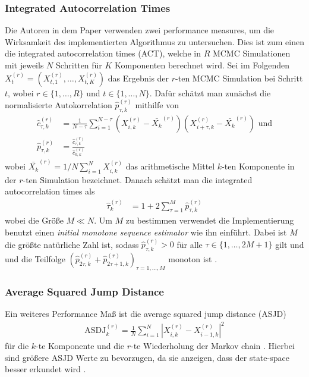 \documentclass{scrartcl}
\begin{document}
    \subsubsection{Integrated Autocorrelation Times}
    Die Autoren in dem Paper \cite{lau2019} verwenden zwei performance measures, um die Wirksamkeit des implementierten
    Algorithmus zu untersuchen. Dies ist zum einen die integrated autocorrelation times (ACT), welche in $R$ MCMC
    Simulationen mit jeweils $N$ Schritten für $K$ Komponenten berechnet wird. Sei im Folgenden
    $X_t^{(r)}=(X_{t,1}^{(r)},\dots,X_{t,K}^{(r)})$ das Ergebnis der $r$-ten MCMC Simulation bei Schritt $t$, wobei
    $r\in\{1,\dots,R\}$ und $t\in\{1,\dots,N\}$. Dafür schätzt man zunächst die normalisierte Autokorrelation $\hat{p}_{\tau,k}^{(r)}$
    mithilfe von
    \begin{align*}
        \hat{c}_{\tau,k}^{(r)}&=\frac{1}{N-\tau}\sum\limits_{i=1}^{N-\tau}(X_{i,k}^{(r)}-\bar{X_k}^{(r)})(X_{i+\tau,k}^{(r)}-\bar{X_k}^{(r)})\text{ und}\\
        \hat{p}_{\tau,k}^{(r)}&=\frac{\hat{c}_{\tau,k}^{(r)}}{\hat{c}_{0,k}^{(r)}}
    \end{align*}
    wobei $\bar{X_k}^{(r)}=1/N\sum\nolimits_{i=1}^NX_{i,k}^{(r)}$ das arithmetische Mittel $k$-ten Komponente in der $r$-ten
    Simulation bezeichnet. Danach schätzt man die integrated autocorrelation times als
    \begin{align*}
        \hat{\tau}_{k}^{(r)}&=1+2\sum\limits_{\tau=1}^M\hat{p}_{\tau,k}^{(r)}
    \end{align*}
    \cite{autocorrelation_blog} wobei die Größe $M\ll N$. Um $M$ zu bestimmen verwendet die Implementierung benutzt einen \textit{initial monotone sequence estimator}
    wie ihn \cite{geyer1992} einführt. Dabei ist $M$ die größte natürliche Zahl ist, sodass $\hat{p}_{\tau,k}^{(r)} > 0$ für alle $\tau\in\{1,\dots,2M+1\}$ gilt und
    und die Teilfolge $(\hat{p}_{2\tau,k}^{(r)} + \hat{p}_{2\tau+1,k}^{(r)})_{\tau=1,\dots,M}$ monoton ist \cite{geyer1992}.

    \subsubsection{Average Squared Jump Distance}
    Ein weiteres Performance Maß ist die average squared jump distance (ASJD)
    \begin{align*}
        \text{ASDJ}_k^{(r)}=\frac{1}{N}\sum\limits_{i=1}^N|X_{i,k}^{(r)}-X_{i-1,k}^{(r)}|^2
    \end{align*}
    für die $k$-te Komponente und die $r$-te Wiederholung der Markov chain \cite{lau2019}.
    Hierbei sind größere ASJD Werte zu bevorzugen, da sie anzeigen, dass der state-space besser erkundet wird \cite{lau2019}.
\end{document}
